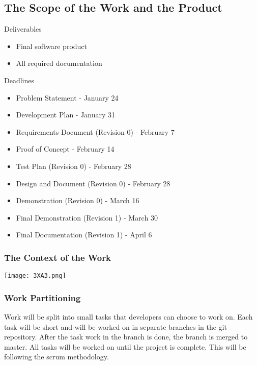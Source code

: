 \documentclass[12pt, titlepage]{article}
\begin{document}
\subsection{The Scope of the Work and the Product}
Deliverables
\begin{itemize}
\item Final software product
\item All required documentation
\end{itemize}

Deadlines
\begin{itemize}
\item Problem Statement - January 24
\item Development Plan - January 31
\item Requirements Document (Revision 0) - February 7
\item Proof of Concept - February 14
\item Test Plan (Revision 0) - February 28
\item Design and Document (Revision 0) - February 28
\item Demonstration (Revision 0) - March 16
\item Final Demonstration (Revision 1) - March 30
\item Final Documentation (Revision 1) - April 6
\end{itemize}
\subsubsection{The Context of the Work}
\texttt{[image: 3XA3.png]}

\subsubsection{Work Partitioning}
Work will be split into small tasks that developers can choose to work on. Each task will be short and will be worked on in separate branches in the git repository. After the task work in the branch is done, the branch is merged to master.
All tasks will be worked on until the project is complete. This will be following the scrum methodology.
\end{document}
